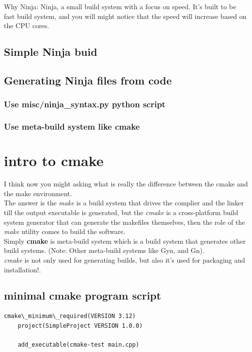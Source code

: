 \documentclass{article}
\begin{document}
Why Ninja: Ninja, a small build system with a focus on speed. It's built to be fast build system, and you will might notice that the speed will increase based on the CPU cores.

\subsection{Simple Ninja buid}





\subsection{Generating Ninja files from code}
\subsubsection{Use misc/ninja\_syntax.py python script}

\subsubsection{Use meta-build system like cmake}

\section{intro to cmake} 
I think now you might asking what is really the difference between the cmake and the make environment.\\
The answer is the \textit{make} is a build system that drives the complier and the linker till the output executable is generated, but the \textit{cmake} is a cross-platform build system generator that can generate the makefiles themselves, then the role of the \textit{make} utility comes to build the software.\\

Simply \textbf{cmake} is meta-build system which is a build system that generates other build systems. (Note: Other meta-build systems like Gyn, and Gn).\\


\textit{cmake} is not only used for generating builds, but also it's used for packaging and installation!.

\subsection{minimal cmake program script}
\begin{lstlisting}[language=make, caption=Simple cmake script]
    cmake\_minimum\_required(VERSION 3.12)
    project(SimpleProject VERSION 1.0.0)
    
    add_executable(cmake-test main.cpp)
\end{lstlisting}
\end{document}
